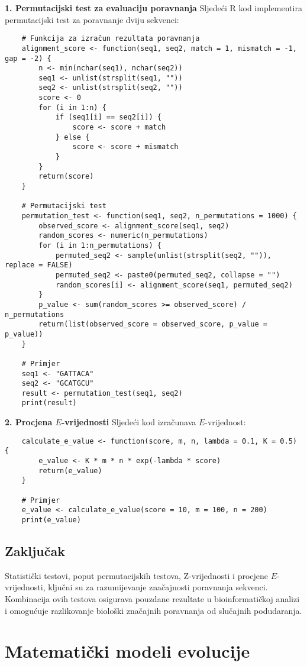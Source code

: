 \documentclass[10pt,a4paper,twoside]{article}
\begin{document}
\textbf{1. Permutacijski test za evaluaciju poravnanja}  
Sljedeći R kod implementira permutacijski test za poravnanje dviju sekvenci:
\begin{verbatim}
	# Funkcija za izračun rezultata poravnanja
	alignment_score <- function(seq1, seq2, match = 1, mismatch = -1, gap = -2) {
		n <- min(nchar(seq1), nchar(seq2))
		seq1 <- unlist(strsplit(seq1, ""))
		seq2 <- unlist(strsplit(seq2, ""))
		score <- 0
		for (i in 1:n) {
			if (seq1[i] == seq2[i]) {
				score <- score + match
			} else {
				score <- score + mismatch
			}
		}
		return(score)
	}
	
	# Permutacijski test
	permutation_test <- function(seq1, seq2, n_permutations = 1000) {
		observed_score <- alignment_score(seq1, seq2)
		random_scores <- numeric(n_permutations)
		for (i in 1:n_permutations) {
			permuted_seq2 <- sample(unlist(strsplit(seq2, "")), replace = FALSE)
			permuted_seq2 <- paste0(permuted_seq2, collapse = "")
			random_scores[i] <- alignment_score(seq1, permuted_seq2)
		}
		p_value <- sum(random_scores >= observed_score) / n_permutations
		return(list(observed_score = observed_score, p_value = p_value))
	}
	
	# Primjer
	seq1 <- "GATTACA"
	seq2 <- "GCATGCU"
	result <- permutation_test(seq1, seq2)
	print(result)
\end{verbatim}

\textbf{2. Procjena \( E \)-vrijednosti}  
Sljedeći kod izračunava \( E \)-vrijednost:
\begin{verbatim}
	calculate_e_value <- function(score, m, n, lambda = 0.1, K = 0.5) {
		e_value <- K * m * n * exp(-lambda * score)
		return(e_value)
	}
	
	# Primjer
	e_value <- calculate_e_value(score = 10, m = 100, n = 200)
	print(e_value)
\end{verbatim}

\subsection*{Zaključak}

Statistički testovi, poput permutacijskih testova, Z-vrijednosti i procjene \( E \)-vrijednosti, ključni su za razumijevanje značajnosti poravnanja sekvenci. Kombinacija ovih testova osigurava pouzdane rezultate u bioinformatičkoj analizi i omogućuje razlikovanje biološki značajnih poravnanja od slučajnih podudaranja.

\section*{Matematički modeli evolucije}
\end{document}
